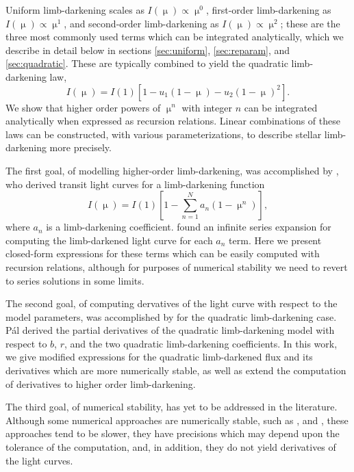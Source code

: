 \documentclass[modern]{aastex61}
\begin{document}
Uniform limb-darkening scales as $I(\upmu) \propto \upmu^0$, first-order 
limb-darkening as $I(\upmu) \propto \upmu^1$, and second-order limb-darkening 
as $I(\upmu)\propto \upmu^2$; these are the three most commonly used  terms
which can be integrated analytically, which we describe in detail below 
in sections \ref{sec:uniform}, \ref{sec:reparam}, and \ref{sec:quadratic}.
These are typically combined to yield the quadratic limb-darkening law,
\begin{equation}
I(\upmu) = I(1) [1-u_1 (1-\upmu) - u_2 (1-\upmu)^2].
\end{equation}
We show that higher order powers of $\upmu^n$ with integer
$n$ can be integrated analytically when expressed as recursion relations.
Linear combinations of these laws can be constructed,
with various parameterizations, to describe stellar limb-darkening more precisely.

The first goal, of modelling higher-order limb-darkening, was accomplished
by \citet{Gimenez2006}, who derived transit light curves for a limb-darkening
function
\begin{equation}
I(\upmu) = I(1) \left[1-\sum_{n=1}^N a_n (1-\upmu^n) \right],
\end{equation}
where $a_n$ is a limb-darkening coefficient.  \cite{Gimenez2006}
found an infinite series expansion for computing the limb-darkened light curve
for each $a_n$ term.  Here we present closed-form expressions for these terms
which can be easily computed with recursion relations, although for purposes
of numerical stability we need to revert to series solutions in some limits.

The second goal, of computing dervatives of the light curve with respect to
the model parameters, was accomplished by \cite{Pal2008} for the quadratic
limb-darkening case.  P\'al derived the partial derivatives of the quadratic
limb-darkening model with respect to $b$, $r$, and the two quadratic
limb-darkening coefficients.  In this work, we give modified expressions
for the quadratic limb-darkened flux and its derivatives which are
more numerically stable, as well as extend the computation of derivatives
to higher order limb-darkening.

The third goal, of numerical stability, has yet to be addressed in the literature.
Although some numerical approaches are numerically stable, such as \cite{Gimenez2006}
\cite{Kreidberg2015}, and \cite{Parviainen2015}, these approaches tend to be 
slower, they have precisions which may depend upon the tolerance of the computation, 
and, in addition, they do not yield derivatives of the light curves.
\end{document}
